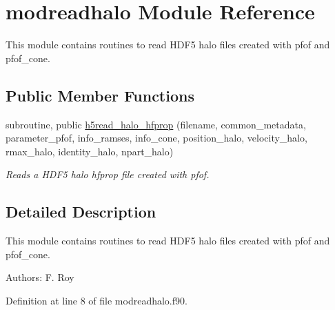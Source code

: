 \hypertarget{classmodreadhalo}{\section{modreadhalo Module Reference}
\label{classmodreadhalo}
}


This module contains routines to read H\-D\-F5 halo files created with pfof and pfof\-\_\-cone.  


\subsection*{Public Member Functions}
\begin{DoxyCompactItemize}
\item 
subroutine, public \hyperlink{classmodreadhalo_a1a011c42c3cd4dbb53fd4a10342a5a09}{h5read\-\_\-halo\-\_\-hfprop} (filename, common\-\_\-metadata, parameter\-\_\-pfof, info\-\_\-ramses, info\-\_\-cone, position\-\_\-halo, velocity\-\_\-halo, rmax\-\_\-halo, identity\-\_\-halo, npart\-\_\-halo)
\begin{DoxyCompactList}\small\item\em Reads a H\-D\-F5 halo hfprop file created with pfof. \end{DoxyCompactList}\end{DoxyCompactItemize}


\subsection{Detailed Description}
This module contains routines to read H\-D\-F5 halo files created with pfof and pfof\-\_\-cone. 

Authors\-: F. Roy 

Definition at line 8 of file modreadhalo.\-f90.



